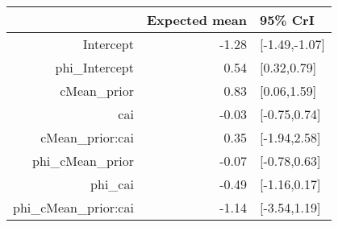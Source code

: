 \begin{tabular}{rrl}
  \hline
 & Expected mean & 95\% CrI \\ 
  \hline
Intercept & -1.28 & [-1.49,-1.07] \\ 
  phi\_Intercept & 0.54 & [0.32,0.79] \\ 
  cMean\_prior & 0.83 & [0.06,1.59] \\ 
  cai & -0.03 & [-0.75,0.74] \\ 
  cMean\_prior:cai & 0.35 & [-1.94,2.58] \\ 
  phi\_cMean\_prior & -0.07 & [-0.78,0.63] \\ 
  phi\_cai & -0.49 & [-1.16,0.17] \\ 
  phi\_cMean\_prior:cai & -1.14 & [-3.54,1.19] \\ 
   \hline
\end{tabular}

